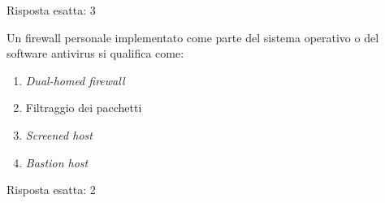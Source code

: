 \begin{Answer} [
  ref={netriep5},
  number={5}
  ]

  \Question Risposta esatta: 3

\end{Answer}


\begin{Exercise} [
  title={Quiz},
  label={netriep6}
  ]

  \Question Un firewall personale implementato come parte del sistema
operativo o del software antivirus si qualifica come:
\begin{enumerate}
 \item \textit{Dual-homed firewall}
 \item Filtraggio dei pacchetti
 \item \textit{Screened host}
 \item \textit{Bastion host}
\end{enumerate}

\end{Exercise}


\begin{Answer} [
  ref={netriep6},
  number={6}
  ]

  \Question Risposta esatta: 2

\end{Answer}
